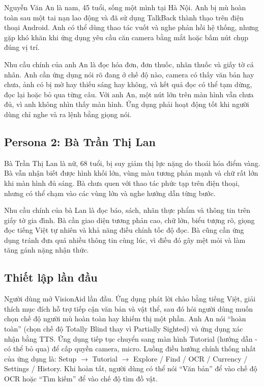 \documentclass[a4paper,13pt]{report}
\begin{document}
Nguyễn Văn An là nam, 45 tuổi, sống một mình tại Hà Nội. Anh bị mù hoàn toàn sau một tai nạn lao động và đã sử dụng TalkBack thành thạo trên điện thoại Android. Anh có thể dùng thao tác vuốt và nghe phản hồi hệ thống, nhưng gặp khó khăn khi ứng dụng yêu cầu căn camera bằng mắt hoặc bấm nút chụp đúng vị trí.

Nhu cầu chính của anh An là đọc hóa đơn, đơn thuốc, nhãn thuốc và giấy tờ cá nhân. Anh cần ứng dụng nói rõ đang ở chế độ nào, camera có thấy văn bản hay chưa, ảnh có bị mờ hay thiếu sáng hay không, và kết quả đọc có thể tạm dừng, đọc lại hoặc bỏ qua từng câu. Với anh An, một nút lớn trên màn hình vẫn chưa đủ, vì anh không nhìn thấy màn hình. Ứng dụng phải hoạt động tốt khi người dùng chỉ nghe và ra lệnh bằng giọng nói.

\subsection{Persona 2: Bà Trần Thị Lan}

Bà Trần Thị Lan là nữ, 68 tuổi, bị suy giảm thị lực nặng do thoái hóa điểm vàng. Bà vẫn nhận biết được hình khối lớn, vùng màu tương phản mạnh và chữ rất lớn khi màn hình đủ sáng. Bà chưa quen với thao tác phức tạp trên điện thoại, nhưng có thể chạm vào các vùng lớn và nghe hướng dẫn từng bước.

Nhu cầu chính của bà Lan là đọc báo, sách, nhãn thực phẩm và thông tin trên giấy tờ gia đình. Bà cần giao diện tương phản cao, chữ lớn, biểu tượng rõ, giọng đọc tiếng Việt tự nhiên và khả năng điều chỉnh tốc độ đọc. Bà cũng cần ứng dụng tránh đưa quá nhiều thông tin cùng lúc, vì điều đó gây mệt mỏi và làm tăng gánh nặng nhận thức.


\subsection{Thiết lập lần đầu}

Người dùng mở VisionAid lần đầu. Ứng dụng phát lời chào bằng tiếng Việt, giải thích mục đích hỗ trợ tiếp cận văn bản và vật thể, sau đó hỏi người dùng muốn chọn chế độ người mù hoàn toàn hay khiếm thị một phần. Anh An nói ``hoàn toàn'' (chọn chế độ Totally Blind thay vì Partially Sighted) và ứng dụng xác nhận bằng TTS. Ứng dụng tiếp tục chuyển sang màn hình Tutorial (hướng dẫn - có thể bỏ qua) để cấp quyền camera, micro. Luồng điều hướng chính thống nhất của ứng dụng là: Setup $\rightarrow$ Tutorial $\rightarrow$ Explore / Find / OCR / Currency / Settings / History. Khi hoàn tất, người dùng có thể nói ``Văn bản'' để vào chế độ OCR hoặc ``Tìm kiếm'' để vào chế độ tìm đồ vật.
\end{document}
